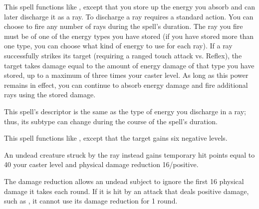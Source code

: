 \begin{spelleffect}
    This spell functions like , except that you store up the energy you absorb and can later discharge it as a ray. To discharge a ray requires a standard action. You can choose to fire any number of rays during the spell's duration. The ray you fire must be of one of the energy types you have stored (if you have stored more than one type, you can choose what kind of energy to use for each ray). If a ray successfully strikes its target (requiring a ranged touch attack vs. Reflex), the target takes damage equal to the amount of energy damage of that type you have stored, up to a maximum of three times your caster level. As long as this power remains in effect, you can continue to absorb energy damage and fire additional rays using the stored damage.
\end{spelleffect}
\begin{spellnotes}
    This spell's descriptor is the same as the type of energy you discharge in a ray; thus, its subtype can change during the course of the spell's duration.
\end{spellnotes}

\begin{spelleffect}
    This spell functions like , except that the target gains six negative levels.
    \par An undead creature struck by the ray instead gains temporary hit points equal to 40 \add your caster level and physical damage reduction 16/positive. 
\end{spelleffect}
\begin{spellnotes}
    The damage reduction allows an undead subject to ignore the first 16 physical damage it takes each round. If it is hit by an attack that deals positive damage, such as , it cannot use its damage reduction for 1 round.
\end{spellnotes}

